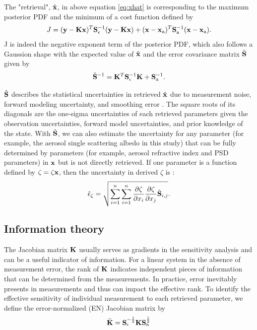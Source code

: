 The "retrieval", $\hat{\mathbf{x}}$, in above equation \eqref{eq:xhat}
is corresponding to the maximum posterior
PDF and the minimum of a cost function defined by
\begin{equation}
J = (\mathbf{y}-\mathbf{K}\mathbf{x})^T\mathbf{S}_\epsilon^{-1}(\mathbf{y}-\mathbf{K}\mathbf{x}) +
    (\mathbf{x}-\mathbf{x}_\text{a})^T\mathbf{S}_\text{a}^{-1}(\mathbf{x}-\mathbf{x}_\text{a}).
\label{eq:cost2}
\end{equation} 
J is indeed the negative exponent term of the posterior PDF, which also
follows a Gaussion shape with the expected value of $\hat{\mathbf{x}}$ and
the error covariance matrix $\hat{\mathbf{S}}$ given by
\begin{equation}
\hat{\mathbf{S}}^{-1} = \mathbf{K}^T\mathbf{S}_\epsilon^{-1}\mathbf{K}+\mathbf{S}_\text{a}^{-1}. \label{eq:shat}
\end{equation}

$\hat{\mathbf{S}}$ describes the statistical uncertainties in retrieved
$\hat{\mathbf{x}}$ due to measurement noise, forward modeling uncertainty, 
and smoothing error \citep{Rodgers00}. The square roots of its 
diagonals are the one-sigma uncertainties of each retrieved parameters 
given the observation uncertainties, forward model uncertainties, 
and prior knowledge of the state. With $\hat{\mathbf{S}}$, we can also 
estimate the uncertainty for any parameter (for example, the aerosol single 
scattering albedo in this study) that can be fully
determined by parameters (for example, aerosol refractive index and PSD
parameters) in $\mathbf{x}$ but is not directly retrieved. If one
parameter is a function defined by $\zeta=\zeta{\mathbf{x}}$, then the 
uncertainty in derived $\zeta$ is \citep{Rodgers00}:
\begin{equation}
\hat{\epsilon}_\zeta =
\sqrt{\sum_{i=1}^n\sum_{i=1}^n
      \frac{\partial\zeta}{\partial{x_i}} 
      \frac{\partial\zeta}{\partial{x_j}}
      \hat{\mathbf{S}}_{i,j}
      }.\label{eq:zeta}
\end{equation}

\subsection{Information theory} \label{subsec:infotheory}

The Jacobian matrix $\mathbf{K}$ usually serves as gradients in the sensitivity
analysis and can be a useful indicator of information. For a linear
system in the absence of measurement error, the rank of $\mathbf{K}$ indicates
independent pieces of information that can be determined from the
measurements. In practice, error inevitably presents in measurements and
thus can impact the effective rank. To identify the effective
sensitivity of individual measurement to each retrieved parameter, we
define the error-normalized (EN) Jacobian matrix by
\begin{equation}
\tilde{\mathbf{K}} = \mathbf{S}_\epsilon^{-\frac{1}{2}}\mathbf{K}\mathbf{S}_\text{a}^{\frac{1}{2}}
\label{eq:enj}
\end{equation}

